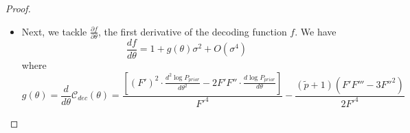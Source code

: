 \begin{proof}
\begin{itemize}
\begin{align*}
\end{align*}
since 
\begin{itemize}
    \item $\mathbb{E}(\delta) = \mathbb{E}(\delta^3) = \mathbb{E}(\delta^5) = 0$
    \item $\mathbb{E}(\delta^2) = \sigma^2$
    \item $\mathbb{E}(\delta^4) = 3\sigma^4$
    \item $\mathbb{E}(\delta^6) = 15\sigma^6$
\end{itemize}
Thus, we have:
\begin{align*}
    var(\delta) &= \mathbb{E}(\delta^2) - [\mathbb{E}(\delta)]^2 = \sigma^2 \\
    var(\delta^2) &= \mathbb{E}(\delta^4) - [\mathbb{E}(\delta^2)]^2 = 3\sigma^4 - \sigma^4 = 2\sigma^4 \\
    var(\delta^3) &= \mathbb{E}(\delta^6) - [\mathbb{E}(\delta^3)]^2 = 15\sigma^6 = O(\sigma^6)\\
    cov(\delta, \delta^2) &= \mathbb{E}(\delta^3) - \mathbb{E}(\delta)\mathbb{E}(\delta^2) = 0 \\
    cov(\delta, \delta^3) &= \mathbb{E}(\delta^4) - \mathbb{E}(\delta)\mathbb{E}(\delta^3) = 3\sigma^4 - 0 = 3\sigma^4 \\
    cov(\delta^2, \delta^3) &= \mathbb{E}(\delta^5) - \mathbb{E}(\delta^2)\mathbb{E}(\delta^3) = 0
\end{align*}
In summary, substituting these back into the full expansion eliminates the zero-covariances and absorbs the higher-order variances into the $O(\sigma^6)$ term:
\begin{align*}
    var(F^{-1}(m)) &= \frac{1}{F'^2} var(\delta) + \frac{F''^2}{4F'^6} var(\delta^2) + 0 - 0 + \frac{3F''^2 - F'F'''}{3F'^6} cov(\delta, \delta^3) - 0 + O(\sigma^6)\\
    &= \frac{\sigma^2}{F'^2} + \frac{F''^2}{4F'^6} (2\sigma^4) + \frac{3F''^2 - F'F'''}{3F'^6} (3\sigma^4) + O(\sigma^6)\\
    &= \frac{\sigma^2}{F'^2} + \frac{F''^2}{2F'^6} \sigma^4 + \frac{3F''^2 - F'F'''}{F'^6} \sigma^4 + O(\sigma^6)\\
    &= \frac{\sigma^2}{F'^2} + \left( \frac{F''^2 + 6F''^2 - 2F'F'''}{2F'^6} \right) \sigma^4 + O(\sigma^6)\\
    &= \frac{\sigma^2}{F'^2} + \frac{7F''^2 - 2F'F'''}{2F'^6} \cdot \sigma^4 + O(\sigma^6)
\end{align*}

    \item Next, we tackle {$\frac{\partial f}{\partial \theta}$}, the first derivative of the decoding function $f$.
We have
\begin{equation}
    \frac{df}{d\theta} = 1 + g(\theta) \sigma^2 + O(\sigma^4)
\end{equation}
where
\begin{equation}\label{eq:derivation-of-g}
    g(\theta) = \frac{d}{d\theta} \mathcal{C}_{dec}(\theta) = \frac{[(F')^2 \cdot \frac{d^2 \log P_{prior}}{d \theta^2} - 2F'F'' \cdot \frac{d \log P_{prior}}{d \theta}]}{F'^4} - \frac{(\tilde{p}+1)(F'F''' - 3F''^2)}{2F'^4}
\end{equation}


\end{itemize}
\end{proof}
